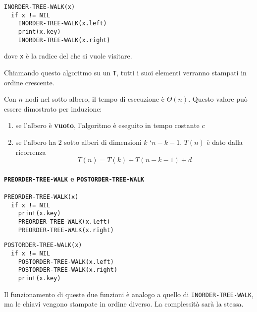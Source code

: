 \documentclass[italian, 10pt]{article}
\begin{document}
\begin{lstlisting}[style=pseudocode, caption={Attraversamento di un BST in modo simmetrico}, label={lst:attraversamento-bst-inorder}]
INORDER-TREE-WALK(x)
  if x != NIL
    INORDER-TREE-WALK(x.left)
    print(x.key)
    INORDER-TREE-WALK(x.right)
\end{lstlisting}

dove \texttt{x} è la radice del \BST che si vuole visitare.

\bigskip
Chiamando questo algoritmo su un \BST \texttt{T}, tutti i suoi elementi verranno stampati in ordine crescente.

Con \(n\) nodi nel sotto albero, il tempo di esecuzione è \(\Theta(n)\).
Questo valore può essere dimostrato per induzione:

\begin{enumerate}
  \item se l'albero è \textbf{vuoto}, l'algoritmo è eseguito in tempo costante \(c\)
  \item se l'albero ha \(2\) sotto alberi di dimensioni \(k\) `\(n - k - 1\), \(T(n)\) è dato dalla ricorrenza
        \[ T(n) = T(k) + T(n - k - 1) + d \]
\end{enumerate}

\paragraph{\texttt{PREORDER-TREE-WALK} e \texttt{POSTORDER-TREE-WALK}}

\begin{minipage}[t]{0.495\textwidth}
  \begin{lstlisting}[style=pseudocode, caption={Attraversamento di un BST in modo anticipato}, label={lst:attraversamento-bst-preorder}]
PREORDER-TREE-WALK(x)
  if x != NIL
    print(x.key)
    PREORDER-TREE-WALK(x.left)
    PREORDER-TREE-WALK(x.right)
  \end{lstlisting}
\end{minipage}
\begin{minipage}[t]{0.495\textwidth}
  \begin{lstlisting}[style=pseudocode, caption={Attraversamento di un BST in modo posticipato}, label={lst:attraversamento-bst-postorder}]
POSTORDER-TREE-WALK(x)
  if x != NIL
    POSTORDER-TREE-WALK(x.left)
    POSTORDER-TREE-WALK(x.right)
    print(x.key)
    \end{lstlisting}
\end{minipage}

Il funzionamento di queste due funzioni è analogo a quello di \texttt{INORDER-TREE-WALK}, ma le chiavi vengono stampate in ordine diverso.
La complessità sarà la stessa.
\end{document}
